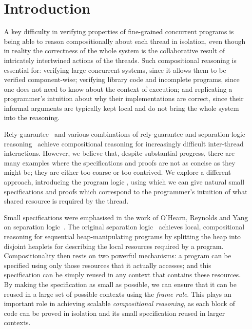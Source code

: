 \section{Introduction}
\label{sec:introduction}



A key difficulty in verifying properties of fine-grained concurrent
programs is being able to reason compositionally about each thread in
isolation, even though in reality the correctness of the whole system
is the collaborative result of intricately intertwined actions of the
threads.  Such compositional reasoning is essential for: verifying
large concurrent systems, since it allows them to be verified
component-wise;  verifying library code and incomplete programs,
since one does not need to know about the context of execution; and 
replicating a programmer's intuition about why their implementations
are correct, since their informal arguments are typically  kept local and do
not bring the whole system into the reasoning.


Rely-guarantee~\cite{rg} and various combinations of
rely-guarantee and separation-logic
reasoning~\cite{viktor-marriage,dg,lrg,cap-ecoop10,icap,tada} achieve
compositional reasoning for increasingly difficult inter-thread
interactions. However, we believe that, despite substantial progress, there are many
examples where the specifications and proofs are not as concise as
they might be; they  are either too coarse or
too 
contrived. 
We explore a different approach, introducing the
program logic \colosl, using which we can give natural small
specifications and proofs which correspond to the  programmer's intuition of what shared
resource
is required by the thread. 




Small specifications were emphasised in the work of O'Hearn, Reynolds
and Yang on separation logic~\cite{o2001local}.  The original
separation logic~\cite{rey02,seplog} achieves local, compositional reasoning
for sequential heap-manipulating programs by splitting the heap into
disjoint heaplets for describing the local resources required by a
program. Compositionality then rests on two powerful mechanisms: a program
can be specified using only those resources that it actually accesses;
and this specification can be simply reused in any context that
contains these resources.  By making the specification as small as
possible, we can ensure that it can be reused in a large set of
possible contexts using the {\em frame rule}. This plays an important
role in achieving scalable \emph{compositional reasoning}, as each
block of code can be proved in isolation and its small specification
reused in larger contexts.


